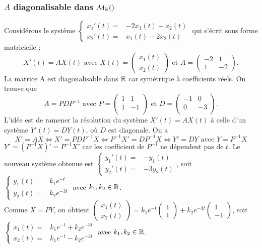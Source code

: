 \documentclass{book}
\begin{document}
\subsubsection{$A$ diagonalisable dans $\Mn{\R}$}
Considérons le système $\begin{cases}x_1'(t)=&-2x_1(t)+x_2(t)\\x_2'(t)=&x_1(t)-2x_2(t) \end{cases}$ qui s'écrit sous forme matricielle :
$$X'(t)=AX(t)\text{ avec } X(t)=\begin{pmatrix}x_1(t)\\x_2(t)\end{pmatrix}\text{ et }A=\begin{pmatrix}-2&1\\1&-2\end{pmatrix}.$$
La matrice A est diagonalisable dans $\mathbb{R}$ car symétrique à coefficients réels. On trouve que 
$$ A=PDP^{-1}\text{ avec } P=\begin{pmatrix}1 &1\\1&-1\\ \end{pmatrix}\text{ et }D=\begin{pmatrix}-1 &0\\0&-3\\ \end{pmatrix}.$$
L'idée est de ramener la résolution du système $X'(t) = AX(t)$  à celle d'un système   $Y'(t)=DY(t)$, où  $D$ est diagonale. On a 
$$X'=AX\Leftrightarrow X'=PDP^{-1}X\Leftrightarrow  P^{-1}X'=DP^{-1}X\Leftrightarrow  Y'=DY \text{ avec } Y=P^{-1}X  $$
$Y'=(P^{-1}X)'=P^{-1}X'$ car les coefficient de $P^{-1}$ ne dépendent pas de $t$.
Le nouveau système obtenue est  $\begin{cases}y_1'(t)=&-y_1(t)\\y_2'(t)=&-3y_2(t) \end{cases}$, soit $\begin{cases}y_1(t)=&k_1 e^{-t}\\y_2(t)=&k_2 e^{-3t} \end{cases}$ avec $k_1,k_2\in\mathbb{R}$.\\
Comme $X=PY$, on obtient 
$\begin{pmatrix}
x_1(t)\\x_2(t)
\end{pmatrix} = k_1e^{-t}\begin{pmatrix}
1\\1
\end{pmatrix}+k_2e^{-3t}\begin{pmatrix}
1\\-1
\end{pmatrix}$, soit   $\begin{cases}x_1(t)=&k_1 e^{-t}+k_2 e^{-3t}\\x_2(t)=&k_1 e^{-t}-k_2 e^{-3t} \end{cases}$ avec $k_1,k_2\in\mathbb{R}$.\\
\end{document}
